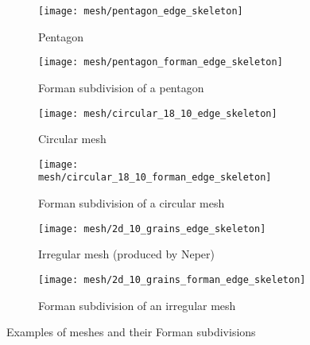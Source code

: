 \begin{figure}[!ht]
  \begin{subfigure}{.45\textwidth}
    \centering
    \texttt{[image: mesh/pentagon\_edge\_skeleton]}
    \caption{Pentagon}
  \end{subfigure}
  \begin{subfigure}{.45\textwidth}
    \centering
    \texttt{[image: mesh/pentagon\_forman\_edge\_skeleton]}
    \caption{Forman subdivision of a pentagon}
  \end{subfigure}

  \begin{subfigure}{.45\textwidth}
    \centering
    \texttt{[image: mesh/circular\_18\_10\_edge\_skeleton]}
    \caption{Circular mesh}
  \end{subfigure}
  \begin{subfigure}{.45\textwidth}
    \centering
    \texttt{[image: mesh/circular\_18\_10\_forman\_edge\_skeleton]}
    \caption{Forman subdivision of a circular mesh}
  \end{subfigure}

  \begin{subfigure}{.45\textwidth}
    \centering
    \texttt{[image: mesh/2d\_10\_grains\_edge\_skeleton]}
    \caption{Irregular mesh (produced by Neper)}
  \end{subfigure}
  \begin{subfigure}{.45\textwidth}
    \centering
    \texttt{[image: mesh/2d\_10\_grains\_forman\_edge\_skeleton]}
    \caption{Forman subdivision of an irregular mesh}
  \end{subfigure}
  \caption{Examples of meshes and their Forman subdivisions}
  \label{figure:mesh/forman_subdivision_examples}
\end{figure}

